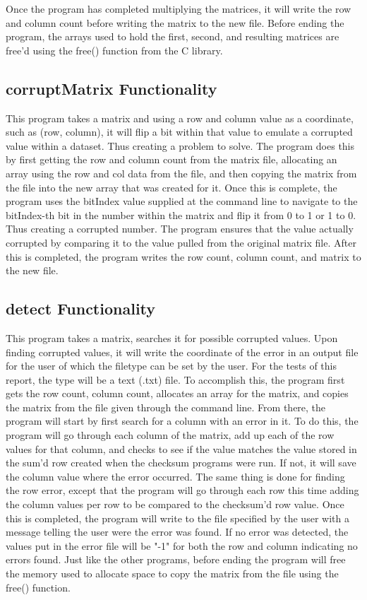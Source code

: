 \documentclass{article}
\begin{document}
\begin{multicols}{2}
    Once the program has completed multiplying the matrices, it will write the row and column count before writing the matrix to the new file. Before ending the
    program, the arrays used to hold the first, second, and resulting matrices are free'd using the free() function from the C library.

    \subsection{corruptMatrix Functionality}\label{subsec:corruptMatrixFunc}
    This program takes a matrix and using a row and column value as a coordinate, such as (row, column), it will flip a bit within that value to emulate a corrupted 
    value within a dataset. Thus creating a problem to solve. The program does this by first getting the row and column count from the matrix file, allocating an array
    using the row and col data from the file, and then copying the matrix from the file into the new array that was created for it. Once this is complete, the program
    uses the bitIndex value supplied at the command line to navigate to the bitIndex-th bit in the number within the matrix and flip it from 0 to 1 or 1 to 0.
    Thus creating a corrupted number. The program ensures that the value actually corrupted by comparing it to the value pulled from the original matrix file. After 
    this is completed, the program writes the row count, column count, and matrix to the new file.
    \subsection{detect Functionality}\label{subsec:detectFunc}
    This program takes a matrix, searches it for possible corrupted values. Upon finding corrupted values, it will write the coordinate of the error in an output file
    for the user of which the filetype can be set by the user. For the tests of this report, the type will be a text (.txt) file. To accomplish this, the program first
    gets the row count, column count, allocates an array for the matrix, and copies the matrix from the file given through the command line. From there, the program will
    start by first search for a column with an error in it. To do this, the program will go through each column of the matrix, add up each of the row values for that column,
    and checks to see if the value matches the value stored in the sum'd row created when the checksum programs were run. If not, it will save the column value where the error
    occurred. The same thing is done for finding the row error, except that the program will go through each row this time adding the column values per row to be compared
    to the checksum'd row value. Once this is completed, the program will write to the file specified by the user with a message telling the user were the error was found.
    If no error was detected, the values put in the error file will be "-1" for both the row and column indicating no errors found. Just like the other programs, before
    ending the program will free the memory used to allocate space to copy the matrix from the file using the free() function.

\end{multicols}
\end{document}
